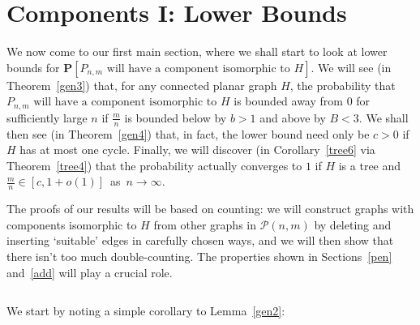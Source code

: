 \documentclass{article}
\newtheorem{Proof of Theorem}{Proof of Theorem}
\begin{document}
\newpage
\section{Components I: Lower Bounds} \label{cptlow}















We now come to our first main section, 
where we shall start to look at lower bounds for
$\mathbf{P}[P_{n,m} \textrm{ will have a component isomorphic to } H]$.
We will see (in Theorem~\ref{gen3}) that,
for any connected planar graph $H$,
the probability that
$P_{n,m} \textrm{ will have a component isomorphic to } H$
is bounded away from $0$ for sufficiently large $n$
if $\frac{m}{n}$ is bounded below by $b>1$ and above by $B<3$.
We shall then see (in Theorem~\ref{gen4}) that, in fact, 
the lower bound need only be $c>0$ if $H$ has at most one cycle. 
Finally,
we will discover
(in Corollary~\ref{tree6} via Theorem~\ref{tree4})
that the probability actually converges to $1$ if $H$ is a tree
and $\frac{m}{n} \in [c,1+o(1)]$~as~$n \to \infty$.

The proofs of our results will be based on counting:
we will construct graphs with components isomorphic to $H$ from other graphs in $\mathcal{P}(n,m)$
by deleting and inserting `suitable' edges in carefully chosen ways,
and we will then show that there isn't too much double-counting.
The properties shown in Sections~\ref{pen} and~\ref{add} will play a crucial role.





\begin{figure}[omitted: a diagram of this paper's results, not reproduced here]\end{figure}












\begin{displaymath}
\end{displaymath} 

We start by noting a simple corollary to Lemma~\ref{gen2}: 
\end{document}
